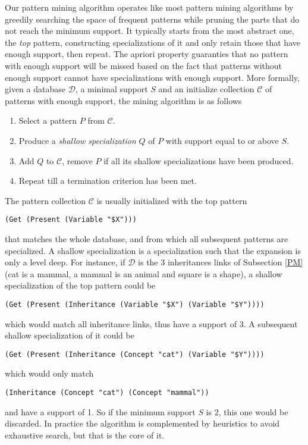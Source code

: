 \documentclass[runningheads]{llncs}
\begin{document}
Our pattern mining algorithm operates like most pattern mining
algorithms \cite{Chi2005Freq} by greedily searching the space of
frequent patterns while pruning the parts that do not reach the
minimum support. It typically starts from the most abstract one, the
\emph{top} pattern, constructing specializations of it and only retain
those that have enough support, then repeat. The apriori property
\cite{Agrawal1994fastalgorithms} guaranties that no pattern with
enough support will be missed based on the fact that patterns without
enough support cannot have specializations with enough support.  More
formally, given a database $\mathcal{D}$, a minimal support $S$ and an
initialize collection $\mathcal{C}$ of patterns with enough support,
the mining algorithm is as follows
\begin{enumerate}
\item Select a pattern $P$ from $\mathcal{C}$.
\item Produce a \emph{shallow specialization} $Q$ of $P$ with support
  equal to or above $S$.
\item Add $Q$ to $\mathcal{C}$, remove $P$ if all its shallow
  specializations have been produced.
\item Repeat till a termination criterion has been met.
\end{enumerate}
The pattern collection $\mathcal{C}$ is usually initialized with the
top pattern
\begin{verbatim}
(Get (Present (Variable "$X")))
\end{verbatim}
that matches the whole database, and from which all subsequent
patterns are specialized. A shallow specialization is a specialization
such that the expansion is only a level deep. For instance, if
$\mathcal{D}$ is the 3 inheritances links of Subsection \ref{PM} (cat
is a mammal, a mammal is an animal and square is a shape), a shallow
specialization of the top pattern could be
\begin{verbatim}
(Get (Present (Inheritance (Variable "$X") (Variable "$Y"))))
\end{verbatim}
which would match all inheritance links, thus have a support of 3. A
subsequent shallow specialization of it could be
\begin{verbatim}
(Get (Present (Inheritance (Concept "cat") (Variable "$Y"))))
\end{verbatim}
which would only match
\begin{verbatim}
(Inheritance (Concept "cat") (Concept "mammal"))
\end{verbatim}
and have a support of 1. So if the minimum support $S$ is 2, this one
would be discarded. In practice the algorithm is complemented by
heuristics to avoid exhaustive search, but that is the core of it.
\end{document}
